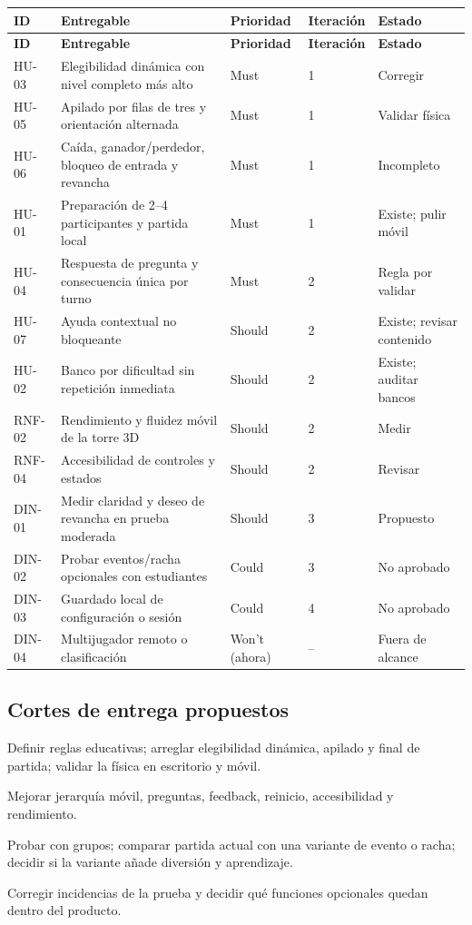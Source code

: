 \documentclass[11pt,letterpaper]{article}
\begin{document}
\begin{longtable}{@{}p{.07\linewidth}p{.38\linewidth}p{.15\linewidth}p{.12\linewidth}p{.12\linewidth}@{}}
\toprule
\textbf{ID} & \textbf{Entregable} & \textbf{Prioridad} & \textbf{Iteración} & \textbf{Estado} \\
\midrule
\endfirsthead
\toprule
\textbf{ID} & \textbf{Entregable} & \textbf{Prioridad} & \textbf{Iteración} & \textbf{Estado} \\
\midrule
\endhead
HU-03 & Elegibilidad dinámica con nivel completo más alto & Must & 1 & Corregir \\
HU-05 & Apilado por filas de tres y orientación alternada & Must & 1 & Validar física \\
HU-06 & Caída, ganador/perdedor, bloqueo de entrada y revancha & Must & 1 & Incompleto \\
HU-01 & Preparación de 2--4 participantes y partida local & Must & 1 & Existe; pulir móvil \\
HU-04 & Respuesta de pregunta y consecuencia única por turno & Must & 2 & Regla por validar \\
HU-07 & Ayuda contextual no bloqueante & Should & 2 & Existe; revisar contenido \\
HU-02 & Banco por dificultad sin repetición inmediata & Should & 2 & Existe; auditar bancos \\
RNF-02 & Rendimiento y fluidez móvil de la torre 3D & Should & 2 & Medir \\
RNF-04 & Accesibilidad de controles y estados & Should & 2 & Revisar \\
DIN-01 & Medir claridad y deseo de revancha en prueba moderada & Should & 3 & Propuesto \\
DIN-02 & Probar eventos/racha opcionales con estudiantes & Could & 3 & No aprobado \\
DIN-03 & Guardado local de configuración o sesión & Could & 4 & No aprobado \\
DIN-04 & Multijugador remoto o clasificación & Won't (ahora) & -- & Fuera de alcance \\
\bottomrule
\end{longtable}

\subsection{Cortes de entrega propuestos}
\begin{description}[leftmargin=2.1cm,style=nextline]
  \item[Iteración 1: reglas y torre] Definir reglas educativas; arreglar elegibilidad dinámica, apilado y final de partida; validar la física en escritorio y móvil.
  \item[Iteración 2: turno legible] Mejorar jerarquía móvil, preguntas, feedback, reinicio, accesibilidad y rendimiento.
  \item[Iteración 3: dinamismo validado] Probar con grupos; comparar partida actual con una variante de evento o racha; decidir si la variante añade diversión y aprendizaje.
  \item[Iteración 4: pulido] Corregir incidencias de la prueba y decidir qué funciones opcionales quedan dentro del producto.
\end{description}
\end{document}
